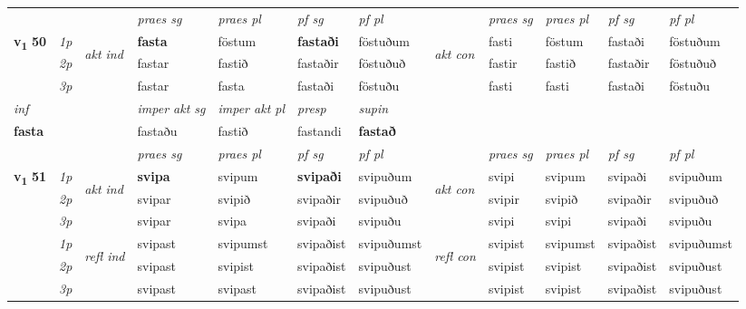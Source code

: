 \begin{longtable}[l]{X>{\footnotesize\itshape}llXXXXlXXXX}
 & &   & \textit{praes sg}  & \textit{praes pl}    & \textit{ pf sg} & \textit{pf pl} & & \textit{praes sg}  & \textit{praes pl}    & \textit{pf sg} & \textit{pf pl }  \\ \cmidrule{4-7} \cmidrule{9-12}
 \multirow{2}{*}{{{\textbf{v{\textsubscript{1}}} \Large{\textbf{50}}}}}  & 1p & \multirow{3}{*}{\begin{turn}{90}\textit{akt ind}\end{turn}} & \textbf{fasta} & föstum & \textbf{fastaði} & föstuðum & \multirow{3}{*}{\begin{turn}{90}\textit{akt con}\end{turn}} &fasti & föstum & fastaði & föstuðum\\*
 & 2p &  &  fastar  & fastið & fastaðir & föstuðuð & & fastir & fastið & fastaðir & föstuðuð \\*
 & 3p &  & fastar & fasta & fastaði & föstuðu & & fasti & fasti& fastaði & föstuðu \\*
\cmidrule{4-7} \cmidrule{9-12}

   {\textit{inf}} & &  & \textit{imper akt sg} & \textit{imper akt pl}   & \textit{presp} & \textit{supin}   \\*
  {\textbf{fasta}} & && fastaðu  & fastið   & fastandi &  \textbf{fastað}   \\*

\midrule

 & &   & \textit{praes sg}  & \textit{praes pl}    & \textit{ pf sg} & \textit{pf pl} & & \textit{praes sg}  & \textit{praes pl}    & \textit{pf sg} & \textit{pf pl }  \\ \cmidrule{4-7} \cmidrule{9-12}
 \multirow{2}{*}{{{\textbf{v{\textsubscript{1}}} \Large{\textbf{51}}}}}  & 1p & \multirow{3}{*}{\begin{turn}{90}\textit{akt ind}\end{turn}} & \textbf{svipa} & svipum & \textbf{svipaði} & svipuðum & \multirow{3}{*}{\begin{turn}{90}\textit{akt con}\end{turn}} &svipi & svipum & svipaði & svipuðum\\*
 & 2p &  &  svipar  & svipið & svipaðir & svipuðuð & & svipir & svipið & svipaðir & svipuðuð \\*
 & 3p &  & svipar & svipa & svipaði & svipuðu & & svipi & svipi& svipaði & svipuðu \\*
\cmidrule{4-7} \cmidrule{9-12}
 & 1p & \multirow{3}{*}{\begin{turn}{90}\textit{refl ind}\end{turn}}  & svipast & svipumst & svipaðist & svipuðumst & \multirow{3}{*}{\begin{turn}{90}\textit{refl con}\end{turn}}  &svipist & svipumst & svipaðist & svipuðumst \\*
 & 2p &  & svipast & svipist & svipaðist & svipuðust & &svipist & svipist & svipaðist & svipuðust \\*
 & 3p  & & svipast & svipast & svipaðist & svipuðust & & svipist & svipist& svipaðist & svipuðust \\*
\cmidrule{4-7} \cmidrule{9-12}


\end{longtable}
